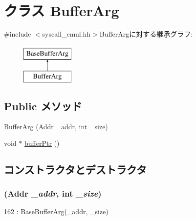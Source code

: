 \hypertarget{classBufferArg}{
\section{クラス BufferArg}
\label{classBufferArg}
}


{\ttfamily \#include $<$syscall\_\-emul.hh$>$}BufferArgに対する継承グラフ:\begin{figure}[H]
\begin{center}
\leavevmode
\includegraphics[height=2cm]{classBufferArg}
\end{center}
\end{figure}
\subsection*{Public メソッド}
\begin{DoxyCompactItemize}
\item 
\hyperlink{classBufferArg_ac2f3614371086fe12590516615fc5251}{BufferArg} (\hyperlink{base_2types_8hh_af1bb03d6a4ee096394a6749f0a169232}{Addr} \_\-addr, int \_\-size)
\item 
void $\ast$ \hyperlink{classBufferArg_affc1f4fbd370639116a6918a46d9b58a}{bufferPtr} ()
\end{DoxyCompactItemize}


\subsection{コンストラクタとデストラクタ}
\hypertarget{classBufferArg_ac2f3614371086fe12590516615fc5251}{
\subsubsection[{BufferArg}]{ ({\bf Addr} {\em \_\-addr}, \/  int {\em \_\-size})}}
\label{classBufferArg_ac2f3614371086fe12590516615fc5251}



\begin{DoxyCode}
162 : BaseBufferArg(_addr, _size) { }
\end{DoxyCode}


